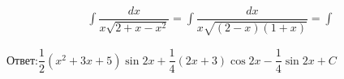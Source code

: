 \begin{eqnarray*}
  \int \dfrac{dx}{x \sqrt{2 + x - x^2}}
  = \int \dfrac{dx}{x \sqrt{(2 - x)(1 + x)}}
  = \int
\end{eqnarray*}

\(
\textbf{Ответ:}
\dfrac{1}{2}(x^2 + 3x + 5) \sin 2x 
+ \dfrac{1}{4}(2x + 3) \cos 2x 
- \dfrac{1}{4} \sin 2x
+ C
\)